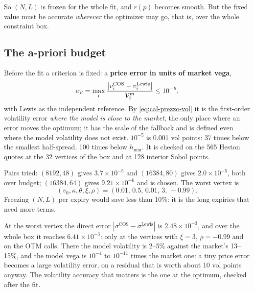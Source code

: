 So $(N,L)$ is frozen for the whole fit, and $r(p)$ becomes smooth. But the fixed value must be accurate
\emph{wherever} the optimizer may go, that is, over the whole constraint box.

\subsection{The a-priori budget}
Before the fit a criterion is fixed: a \textbf{price error in units of market vega},
\begin{equation}\label{eq:cal-budget}
e_{\mathcal{V}}=\max_i\frac{\big|v^{\mathrm{COS}}_i-v^{\mathrm{Lewis}}_i\big|}{\mathcal{V}^m_i}\le10^{-5},
\end{equation}
with Lewis as the independent reference. By \eqref{eq:cal-prezzo-vol} it is the first-order volatility error
\emph{where the model is close to the market}, the only place where an error moves the optimum; it has the scale of
the fallback and is defined even where the model volatility does not exist. $10^{-5}$ is 0.001 vol points: 37 times
below the smallest half-spread, 100 times below $h_{\min}$. It is checked on the 565 Heston quotes at the 32 vertices
of the box and at 128 interior Sobol points.

Pairs tried: $(8192,48)$ gives $3.7\times10^{-5}$ and $(16384,80)$ gives $2.0\times10^{-5}$, both over budget;
$(16384,64)$ gives $9.21\times10^{-6}$ and is chosen. The worst vertex is
\[
(v_0,\kappa,\theta,\xi,\rho)=(0.01,\,0.5,\,0.01,\,3,\,-0.99).
\]
Freezing $(N,L)$ per expiry would save less than 10\%: it is the long expiries that need more terms.

\begin{attenzione}[title={The budget is not a volatility accuracy}]
At the worst vertex the direct error $|\sigma^{\mathrm{COS}}-\sigma^{\mathrm{Lewis}}|$ is $2.48\times10^{-3}$, and
over the whole box it reaches $6.41\times10^{-3}$: only at the vertices with $\xi=3$, $\rho=-0.99$ and on the OTM
calls. There the model volatility is 2--5\% against the market's 13--15\%, and the model vega is $10^{-4}$ to
$10^{-11}$ times the market one: a tiny price error becomes a large volatility error, on a residual that is worth
about 10 vol points anyway. The volatility accuracy that matters is the one at the optimum, checked after the fit.
\end{attenzione}

